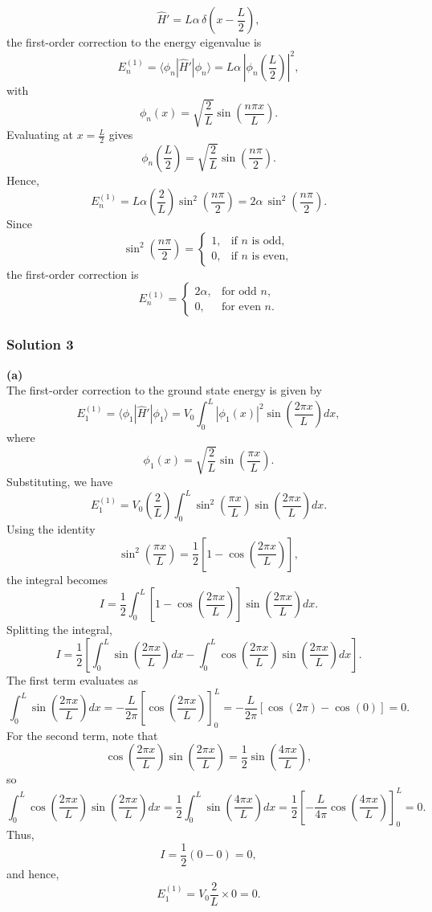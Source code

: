 \documentclass{article}
\begin{document}
\[
\hat{H}'= L\alpha\, \delta\left(x-\frac{L}{2}\right),
\]
the first-order correction to the energy eigenvalue is
\[
E_n^{(1)} = \langle \phi_n|\hat{H}'|\phi_n\rangle 
= L\alpha\, \left|\phi_n\left(\frac{L}{2}\right)\right|^2,
\]
with 
\[
\phi_n(x)=\sqrt{\frac{2}{L}} \sin\left(\frac{n\pi x}{L}\right).
\]
Evaluating at \(x=\frac{L}{2}\) gives
\[
\phi_n\left(\frac{L}{2}\right) = \sqrt{\frac{2}{L}} \sin\left(\frac{n\pi}{2}\right).
\]
Hence,
\[
E_n^{(1)} = L\alpha \left(\frac{2}{L}\right) \sin^2\left(\frac{n\pi}{2}\right)
= 2\alpha\, \sin^2\left(\frac{n\pi}{2}\right).
\]
Since
\[
\sin^2\left(\frac{n\pi}{2}\right)= 
\begin{cases}
1, & \text{if } n \text{ is odd},\\[1mm]
0, & \text{if } n \text{ is even},
\end{cases}
\]
the first-order correction is
\[
E_n^{(1)} =
\begin{cases}
2\alpha, & \text{for odd } n,\\[1mm]
0, & \text{for even } n.
\end{cases}
\]

\subsubsection{Solution 3}
\textbf{(a)} \\
The first-order correction to the ground state energy is given by
\[
E_1^{(1)} = \langle \phi_1 | \hat{H}' | \phi_1 \rangle 
= V_0 \int_0^L |\phi_1(x)|^2 \sin\left(\frac{2\pi x}{L}\right) dx,
\]
where 
\[
\phi_1(x) = \sqrt{\frac{2}{L}} \sin\left(\frac{\pi x}{L}\right).
\]
Substituting, we have
\[
E_1^{(1)} = V_0 \left(\frac{2}{L}\right) \int_0^L \sin^2\left(\frac{\pi x}{L}\right) \sin\left(\frac{2\pi x}{L}\right) dx.
\]
Using the identity
\[
\sin^2\left(\frac{\pi x}{L}\right) = \frac{1}{2}\left[1-\cos\left(\frac{2\pi x}{L}\right)\right],
\]
the integral becomes
\[
I = \frac{1}{2} \int_0^L \left[1-\cos\left(\frac{2\pi x}{L}\right)\right] \sin\left(\frac{2\pi x}{L}\right) dx.
\]
Splitting the integral,
\[
I = \frac{1}{2}\left[\int_0^L \sin\left(\frac{2\pi x}{L}\right)dx - \int_0^L \cos\left(\frac{2\pi x}{L}\right)\sin\left(\frac{2\pi x}{L}\right)dx\right].
\]
The first term evaluates as
\[
\int_0^L \sin\left(\frac{2\pi x}{L}\right)dx = -\frac{L}{2\pi} \left[\cos\left(\frac{2\pi x}{L}\right)\right]_0^L = -\frac{L}{2\pi}[\cos(2\pi)-\cos(0)] = 0.
\]
For the second term, note that
\[
\cos\left(\frac{2\pi x}{L}\right)\sin\left(\frac{2\pi x}{L}\right) = \frac{1}{2}\sin\left(\frac{4\pi x}{L}\right),
\]
so
\[
\int_0^L \cos\left(\frac{2\pi x}{L}\right)\sin\left(\frac{2\pi x}{L}\right)dx = \frac{1}{2}\int_0^L \sin\left(\frac{4\pi x}{L}\right)dx = \frac{1}{2}\left[-\frac{L}{4\pi}\cos\left(\frac{4\pi x}{L}\right)\right]_0^L = 0.
\]
Thus, 
\[
I = \frac{1}{2}(0-0)=0,
\]
and hence,
\[
E_1^{(1)} = V_0 \frac{2}{L} \times 0 = 0.
\]
\end{document}
